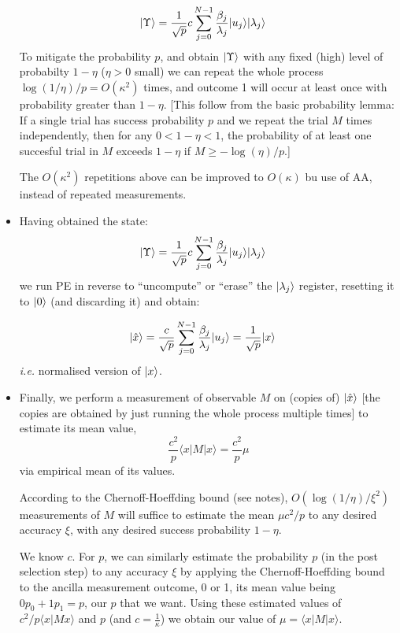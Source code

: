 \documentclass[]{article}
\renewcommand{\it}[1]{\textit{#1}}
\begin{document}
\begin{remark*}
\begin{itemize}
		\begin{align*}
			\lvert\Upsilon\rangle &= \frac{1}{\sqrt{p}}c\sum_{j=0}^{N-1}\frac{\beta_j}{\lambda_j}\lvert u_j\rangle\lvert\lambda_j\rangle
		\end{align*}
		To mitigate the probability $p$, and obtain $\lvert\Upsilon\rangle$ with any fixed (high) level of probabilty $1 - \eta$ ($\eta > 0$ small) we can repeat the whole process $\log(1/\eta)/p = O(\kappa^2)$ times, and outcome 1 will occur at least once with probability greater than $1 - \eta$. [This follow from the basic probability lemma: If a single trial has success probability $p$ and we repeat the trial $M$ times independently, then for any $0 < 1 - \eta < 1$, the probability of at least one succesful trial in $M$ exceeds $1-\eta$ if $M \ge -\log(\eta)/p$.]

		\begin{remark*}
			The $O(\kappa^2)$ repetitions above can be improved to $O(\kappa)$ bu use of AA, instead of repeated measurements.
		\end{remark*}

		\item Having obtained the state:
		\begin{align*}
			\lvert\Upsilon\rangle &= \frac{1}{\sqrt{p}}c\sum_{j=0}^{N-1}\frac{\beta_j}{\lambda_j}\lvert u_j\rangle\lvert\lambda_j\rangle
		\end{align*}
		we run PE in reverse to ``uncompute'' or ``erase'' the $\lvert\lambda_j\rangle$ register, resetting it to $\lvert0\rangle$ (and discarding it) and obtain:

		\begin{align*}
			\lvert\hat{x}\rangle &= \frac{c}{\sqrt{p}}\sum_{j=0}^{N-1}\frac{\beta_j}{\lambda_j}\lvert u_j\rangle = \frac{1}{\sqrt{p}}\lvert x\rangle
		\end{align*}
		\it{i.e.} normalised version of $\lvert x\rangle$.

		\item Finally, we perform a measurement of observable $M$ on (copies of) $\lvert\hat{x}\rangle$ [the copies are obtained by just running the whole process multiple times] to estimate its mean value, $$\frac{c^2}{p}\langle x | M | x \rangle = \frac{c^2}{p}\mu$$ via empirical mean of its values.
		
		According to the Chernoff-Hoeffding bound (see notes), $O(\log(1/\eta)/\xi^2)$ measurements of $M$ will suffice to estimate the mean $\mu c^2/p$ to any desired accuracy $\xi$, with any desired success probability $1 - \eta$.

		We know $c$. For $p$, we can similarly estimate the probability $p$ (in the post selection step) to any accuracy $\xi$ by applying the Chernoff-Hoeffding bound to the ancilla measurement outcome, 0 or 1, its mean value being $0p_0 + 1p_1 = p$, our $p$ that we want. Using these estimated values of $c^2/p \langle x|M x\rangle$ and $p$ (and $c = \frac{1}{\kappa}$) we obtain our value of $\mu = \langle x | M | x\rangle$.
	\end{itemize}
\end{remark*}
\end{document}
